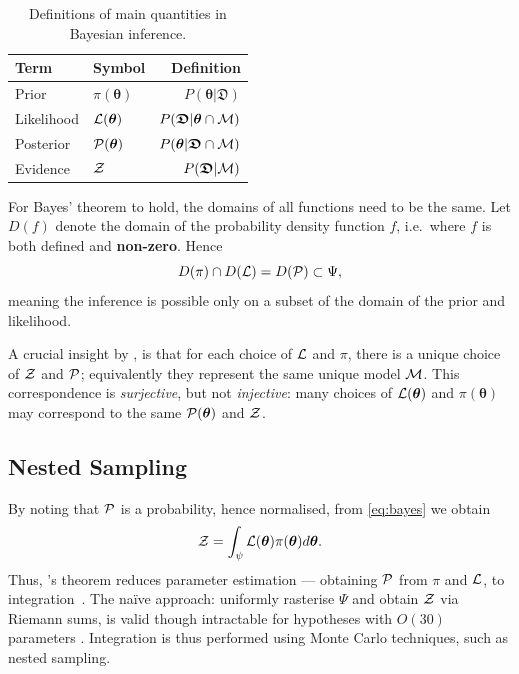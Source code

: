 \documentclass[usenatbib]{mnras}
\begin{document}
\begin{table}
  \caption{Definitions of main quantities in Bayesian inference.   \label{table-defs}}
\centering
\begin{tabular}{llr}
\textbf{\textbf{Term}} & \textbf{\textbf{Symbol}} & \textbf{\textbf{Definition}}\\
\hline
  Prior  & \(\pi(\bm{\theta})\) & \(P ( \bm{\theta}  \vert \bm{ \mathfrak{D}})\) \\
  Likelihood  & \({\cal L}(\bm{\theta})\) & \(P ( \bm{\mathfrak{D}} \vert \bm{\theta} \cap {\cal M})\) \\
  Posterior  & \({\cal P}(\bm{\theta})\) & \(P ( \bm{\theta} \vert \bm{\mathfrak{D}} \cap {\cal M})\) \\
Evidence & \({\cal Z}\) & \(P ( \bm{\mathfrak{D}} \vert {\cal M})\) \\
\end{tabular}
\end{table}


For Bayes' theorem to hold, the domains of all functions need to be
the same. Let \(D(f)\) denote the domain of the probability density
function \(f\), i.e.~where \(f\) is both defined and
\textbf{non-zero}. Hence
\begin{equation}
  D(\pi) \cap D({\cal L})  = D({\cal P}) \subset \Psi,
\end{equation} 
meaning the inference is possible only on a subset of the domain of
the prior and likelihood.\label{domain-discussion}

A crucial insight by \cite{chen-ferroz-hobson}, is that for each
choice of ${\cal L}$ and $\pi$, there is a unique choice of ${\cal Z}$
and ${\cal P}$; equivalently they represent the same unique model
${\cal M}$. This correspondence is \emph{surjective}, but not
\emph{injective}: many choices of \({\cal L}(\bm{\theta})\) and
\(\pi (\bm{\theta})\) may correspond to the same
\( {\cal P} (\bm{\theta})\) and \({\cal Z}\).


\subsection{Nested Sampling}\label{sec:org36366f8}

By noting that ${\cal P}$ is a probability, hence normalised, from
\cref{eq:bayes} we obtain
\begin{equation}
  \label{eq:def-z}
  {\cal Z} = \int_{\psi} {\cal L}(\bm{\theta}) \pi(\bm{\theta}) d\bm{\theta}. 
\end{equation}
Thus, \citeauthor{1763}'s theorem reduces parameter estimation ---
obtaining ${\cal P}$ from $\pi$ and ${\cal L}$, to
integration~\citep{bayes-integration}. The naïve approach: uniformly
rasterise \(\Psi\) and obtain \({\cal Z}\) via Riemann sums, is valid
though intractable for hypotheses with \(O(30)\) parameters
\citep{Caflisch_1998}. Integration is thus performed using Monte Carlo
techniques, such as nested sampling.
\end{document}
